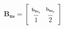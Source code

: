 \documentclass[preview]{standalone}
\begin{document}
\begin{align*}
{\mathbf{B_{ns}} = \begin{bmatrix} \overbrace{1}^{\mathbf{b}_{\mathbf{ns_x}}}& \overbrace{2}^{\mathbf{b}_{\mathbf{ns_y}}} \end{bmatrix}}
\end{align*}
\end{document}
